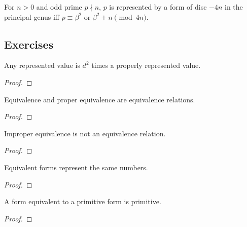 \begin{theorem}
  \label{thm:genus_congruence}
  \leanok
  For $n>0$ and odd prime $p \nmid n$, $p$ is represented by a form of disc $-4n$
  in the principal genus iff $p \equiv \beta^2$ or $\beta^2 + n \pmod{4n}$.
\end{theorem}

\subsection{Exercises}

\begin{theorem}[Exercise 2.1]
  \label{exr:s2_1}
  \leanok
  Any represented value is $d^2$ times a properly represented value.
\end{theorem}
\begin{proof}\end{proof}

\begin{theorem}[Exercise 2.2(a)]
  \label{exr:s2_2_a}
  \leanok
  Equivalence and proper equivalence are equivalence relations.
\end{theorem}
\begin{proof}\leanok{}\end{proof}

\begin{theorem}[Exercise 2.2(b)]
  \label{exr:s2_2_b}
  \leanok
  Improper equivalence is not an equivalence relation.
\end{theorem}
\begin{proof}\end{proof}

\begin{theorem}[Exercise 2.2(c)]
  \label{exr:s2_2_c}
  \leanok
  Equivalent forms represent the same numbers.
\end{theorem}
\begin{proof}\end{proof}

\begin{theorem}[Exercise 2.2(d)]
  \label{exr:s2_2_d}
  \leanok
  A form equivalent to a primitive form is primitive.
\end{theorem}
\begin{proof}\end{proof}

